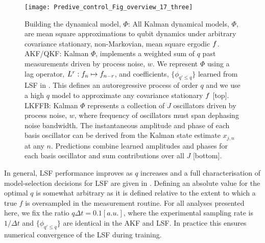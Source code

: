 \documentclass[pra, reprint]{revtex4-1}
\begin{document}
\begin{figure} [tp]
    \texttt{[image: Predive\_control\_Fig\_overview\_17\_three]}
    \caption{\label{Predive_control_Fig_overview_17_three} Building the dynamical model, $\Phi$: All Kalman dynamical models, $\Phi$, are mean square approximations to qubit dynamics under arbitrary covariance stationary, non-Markovian, mean square ergodic $f$. AKF/QKF: Kalman $\Phi$, implements a weighted sum of $q$ past measurements driven by process noise, $w$. We represent $\Phi$ using a lag operator, $L^r: f_n \mapsto f_{n-r}$, and coefficients, $ \{ \phi_{q' \leq q} \}$ learned from LSF in \cite{mavadia2017}. This defines an autoregressive process of order $q$ and we use a high $q$ model to approximate any covariance stationary $f$ [top]. LKFFB: Kalman $\Phi$ represents a collection of $J$ oscillators driven by process noise, $w$, where frequency of oscillators must span dephasing noise bandwidth. The instantaneous amplitude and phase of each basis oscillator can be derived from the Kalman state estimate $x_{j, n}$ at any $n$. Predictions combine learned amplitudes and phases for each basis oscillator and sum contributions over all $J$ [bottom].}
\end{figure}

In general, LSF performance improves as $q$ increases and a full characterisation of model-selection decisions for LSF are given in \cite{mavadia2017}. Defining an absolute value for the optimal $q$ is somewhat arbitrary as it is defined relative to the extent to which a true $f$ is oversampled in the measurement routine. For all analyses presented here, we fix the ratio $q \Delta t = 0.1 [a.u.]$, where the experimental sampling rate is $1/\Delta t$ and $\{\phi_{q' \leq q}\}$ are identical in the AKF and LSF.   In practice this ensures numerical convergence of the LSF during training.
\end{document}
